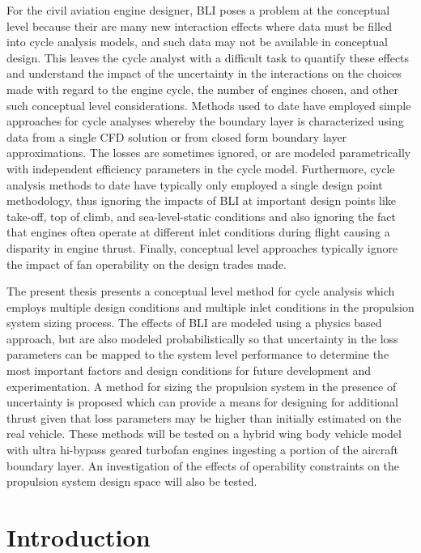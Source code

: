 \documentclass[12pt]{gatech-thesis}
\begin{document}
\begin{preliminary}
\begin{summary}
\indent  For the civil aviation engine designer, BLI poses a problem at the conceptual level because their are many new interaction effects where data must be filled into cycle analysis models, and such data may not be available in conceptual design.  This leaves the cycle analyst with a difficult task to quantify these effects and understand the impact of the uncertainty in the interactions on the choices made with regard to the engine cycle, the number of engines chosen, and other such conceptual level considerations.  Methods used to date have employed simple approaches for cycle analyses whereby the boundary layer is characterized using data from a single CFD solution or from closed form boundary layer approximations.  The losses are sometimes ignored, or are modeled parametrically with independent efficiency parameters in the cycle model.  Furthermore, cycle analysis methods to date have typically only employed a single design point methodology, thus ignoring the impacts of BLI at important design points like take-off, top of climb, and sea-level-static conditions and also ignoring the fact that engines often operate at different inlet conditions during flight causing a disparity in engine thrust.  Finally, conceptual level approaches typically ignore the impact of fan operability on the design trades made.

\indent The present thesis presents a conceptual level method for cycle analysis which employs multiple design conditions and multiple inlet conditions in the propulsion system sizing process.  The effects of BLI are modeled using a physics based approach, but are also modeled probabilistically so that uncertainty in the loss parameters can be mapped to the system level performance to determine the most important factors and design conditions for future development and experimentation.  A method for sizing the propulsion system in the presence of uncertainty is proposed which can provide a means for designing for additional thrust given that loss parameters may be higher than initially estimated on the real vehicle.  These methods will be tested on a hybrid wing body vehicle model with ultra hi-bypass geared turbofan engines ingesting a portion of the aircraft boundary layer.  An investigation of the effects of operability constraints on the propulsion system design space will also be tested.


\end{summary}
\end{preliminary}
\chapter{Introduction}
\end{document}
